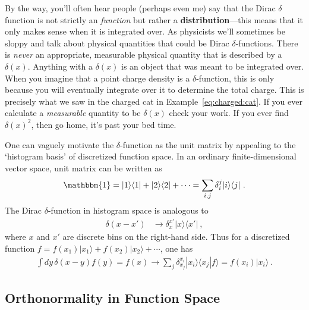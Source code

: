 By the way, you'll often hear people (perhaps even me) say that the Dirac $\delta$ function is not strictly an \emph{function} but rather a \textbf{distribution}---this means that it only makes sense when it is integrated over. As physicists we'll sometimes be sloppy and talk about physical quantities that could be Dirac $\delta$-functions. There is \emph{never} an appropriate, measurable physical quantity that is described by a $\delta(x)$. Anything with a $\delta(x)$ is an object that was meant to be integrated over. When you imagine that a point charge density is a $\delta$-function, this is only because you will eventually integrate over it to determine the total charge. This is precisely what we saw in the charged cat in Example~\ref{eq:charged:cat}. If you ever calculate a \emph{measurable} quantity to be $\delta(x)$ check your work. If you ever find $\delta(x)^2$, then go home, it's past your bed time.

\begin{example}
One can vaguely motivate the $\delta$-function as the unit matrix by appealing to the `histogram basis' of discretized function space. In an ordinary finite-dimensional vector space, unit matrix can be written as
\begin{align}
	\mathbbm{1} = |1\rangle\langle 1 | + |2\rangle\langle 2 | + \cdots
	= \sum_{i,j}\delta_{i}^j|i\rangle\langle j| \ .
\end{align}
The Dirac $\delta$-function in histogram space is analogous to
\begin{align}
	\delta(x-x') &\to \delta_{x}^{x'}|x\rangle\langle x'| \ ,
\end{align}
where $x$ and $x'$ are discrete bins on the right-hand side. Thus for a discretized function $f = f(x_1)|x_1\rangle + f(x_2)|x_2\rangle + \cdots$, one has
\begin{align}
	\int dy\, \delta(x-y) f(y) = f(x) \longrightarrow \sum_j \delta_{x_j}^{x_i}|x_i\rangle\langle x_j| f\rangle  =  f(x_i) |x_i\rangle\ .
\end{align}



\end{example}

\subsection{Orthonormality in Function Space}

